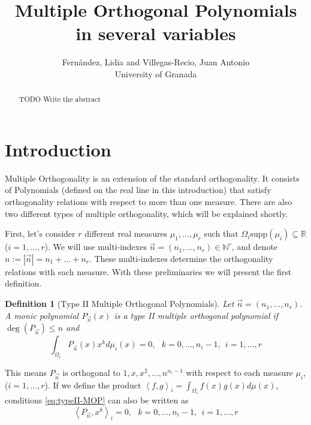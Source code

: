 \documentclass[12pt,a4]{article}
\theoremstyle{plain}
\newtheorem{definition}[theorem]{Definition}
\newcommand{\R}[0]{\mathbb{R}}
\newcommand{\N}[0]{\mathbb{N}}
\newcommand{\supp}[0]{\mathrm{supp}}
\newcommand{\cred}[1]{{\color{red} #1}}
\newcommand{\prodesc}[2]{\left\langle #1 , #2 \right\rangle}
\begin{document}
\title{Multiple Orthogonal Polynomials in several variables}


\author{Fernández, Lidia and Villegas-Recio, Juan Antonio\\
\small University of Granada}
\maketitle

\begin{abstract}
\cred{TODO Write the abstract}
\end{abstract}

\section{Introduction}

Multiple Orthogonality is an extension of the standard orthogonality. It consists of Polynomials (defined on the real line in this introduction) that satisfy orthogonality relations with respect to more than one measure. There are also two different types of multiple orthogonality, which will be explained shortly.

First, let's consider $r$ different real measures $\mu_1,\dots,\mu_r$ such that $\Omega_i\supp(\mu_i)\subseteq\R$ ($i=1,\dots,r$). We will use multi-indexes $\vec n = (n_1, \dots,n_r)\in \N^r$, and denote $n:=|\vec n| = n_1 + \dots + n_r$. These multi-indexes determine the orthogonality relations with each measure. With these preliminaries we will present the first definition.

\begin{definition}[Type II Multiple Orthogonal Polynomials]
    Let $\vec n = (n_1,\dots,n_r)$. A monic polynomial $P_{\vec n}(x)$ is a type II multiple orthogonal polynomial if $\deg(P_{\vec n})\leq n$ and 
    \begin{equation}
        \label{eq:typeII-MOP}
        \int_{\Omega_i} P_{\vec n}(x) x^k d\mu_i(x) = 0, \ \ \ k=0,\dots,n_{i}-1, \ \ i = 1,\dots,r
    \end{equation}
\end{definition}

This means $P_{\vec n}$ is orthogonal to $1,x,x^2,\dots,n^{n_i-1}$ with respect to each measure $\mu_i$, ($i=1,\dots,r$). If we define the product $\prodesc{f}{g}_i=\int_{\Omega_i}f(x)g(x)d\mu(x)$, conditions \eqref{eq:typeII-MOP} can also be written as
\begin{equation}
    \label{eq:typeII-MOP-dot}
    \prodesc{P_{\vec n}}{x^k}_i = 0, \ \ \ k=0,\dots,n_{i}-1, \ \ i = 1,\dots,r
\end{equation}
\end{document}
